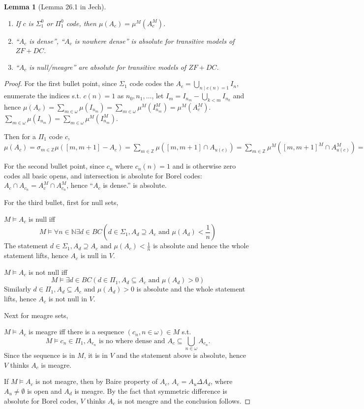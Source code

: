 \documentclass{article}
\newtheorem{lemma}{Lemma}
\begin{document}
\begin{lemma}[Lemma 26.1 in Jech]
    \begin{enumerate}
        \item If $c$ is $\Sigma^0_1$ or $\Pi^0_1$ code, then $\mu(A_c) = \mu^M(A_c^M)$.
        \item ``$A_c$ is dense'', ``$A_c$ is nowhere dense'' is absolute for transitive models of $ZF+DC$.
        \item ``$A_c$ is null/meagre'' are absolute for transitive models of $ZF+DC$.
    \end{enumerate}
\end{lemma}

\begin{proof}
    For the first bullet point, since $\Sigma_1$ code codes the $A_c = \bigcup_{n\mid c(n) = 1}I_n$, enumerate the indices s.t. $c(n) = 1$ as $n_0,n_1,\dots$, let $I_{m} = I_{n_m} - \bigcup_{k< m}I_{n_k}$ and hence $\mu(A_c) = \sum_{m\in \omega} \mu(I_{n_m}) = \sum_{m\in \omega} \mu^M(I_{n_m}^M) =  \mu^M(A_c^M)$. $\sum_{m\in \omega} \mu(I_{n_m}) = \sum_{m\in \omega} \mu^M(I_{n_m}^M)$.

    Then for a $\Pi_1$ code $c$, $\mu(A_c) = \sigma_{m\in \mathbb{Z}}\mu([m,m+1] - A_c )= \sum_{m\in \mathbb{Z}}\mu([m,m+1] \cap A_{u(c)} ) = \sum_{m\in \mathbb{Z}}\mu^M([m,m+1]^M \cap A_{u(c)}^M ) = \mu^M(A_c^M)$

    For the second bullet point, since $c_n$ where $c_n(n) = 1$ and is otherwise zero codes all basic opens, and intersection is absolute for Borel codes: $A_c\cap A_{c_n} = A_c^M\cap A_{c_n}^M$, hence ``$A_c$ is dense.'' is absolute.

    For the third bullet, first for null sets,

    $M\models A_c$ is null iff $$M\models \forall n\in \mathbb{N}\exists d\in BC(d\in \Sigma_1, A_d\supseteq A_c\text{ and }\mu(A_d)<\frac{1}{n})$$
    The statement $d\in \Sigma_1, A_d\supseteq A_c\text{ and }\mu(A_c)<\frac{1}{n}$ is absolute and hence the whole statement lifts, hence $A_c$ is null in $V$.

    $M\models A_c$ is not null iff $$M\models \exists d\in BC(d\in \Pi_1, A_d\subseteq A_c\text{ and }\mu(A_d)>0)$$
    Similarly $d\in \Pi_1, A_d\subseteq A_c\text{ and }\mu(A_d)>0$ is absolute and the whole statement lifts, hence $A_c$ is not null in $V$.

    Next for meagre sets, 

    $M\models A_c$ is meagre iff there is a sequence $(c_n,n\in \omega)\in M$ s.t. $$M\models c_n\in \Pi_1, A_{c_n} \text{ is no where dense and } A_c\subseteq \bigcup_{n\in \omega}A_{c_n}.$$
    Since the sequence is in $M$, it is in $V$ and the statement above is absolute, hence $V$ thinks $A_c$ is meagre.

    If $M\models A_c$ is not meagre, then by Baire property of $A_c$, $A_c = A_u\Delta A_d$, where $A_u\neq \emptyset$ is open and $A_d$ is meagre. By the fact that symmetric difference is absolute for Borel codes, $V$ thinks $A_c$ is not meagre and the conclusion follows.

    
\end{proof}
\end{document}
